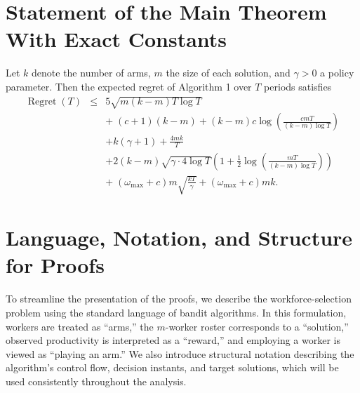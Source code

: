 \documentclass[opre,blindrev]{informs3}
\newcommand{\Regret}{\operatorname{Regret}}
\begin{document}
\newpage
\begin{APPENDICES}



    
\vspace{.1in}


\section{Statement of the Main Theorem With Exact Constants}\label{sec:thm-all-constants}
Let \(k\) denote the number of arms, \(m\) the size of each solution, and \(\gamma>0\) a policy parameter. Then the expected regret of Algorithm 1 over \(T\) periods satisfies
\begin{eqnarray*}
    \Regret(T) &\leq& 5\sqrt{m(k-m)T\log T}\\
    &&+\;(c+1)(k-m) +(k-m)c\log\left(\frac{cmT}{(k-m)\log T}\right)\\
    &&+ k(\gamma + 1) + \frac{4mk}{T}\\
    &&+2(k-m)\sqrt{\gamma \cdot 4\log T}
    \left(1+\frac{1}{2}\log\!\left(\frac{mT}{(k-m)\log T}\right)\right)\\
    &&+\;(\omega_{\max}+c) m\sqrt{\frac{kT}{\gamma}} + (\omega_{\max}+c)mk.
\end{eqnarray*}

\section{Language, Notation, and Structure for Proofs}
To streamline the presentation of the proofs, we describe the workforce-selection problem using the standard language of bandit algorithms. In this formulation, workers are treated as ``arms,'' the \(m\)-worker roster corresponds to a ``solution,'' observed productivity is interpreted as a ``reward,'' and employing a worker is viewed as ``playing an arm.'' We also introduce structural notation describing the algorithm's control flow, decision instants, and target solutions, which will be used consistently throughout the analysis.


\end{APPENDICES}
\end{document}
